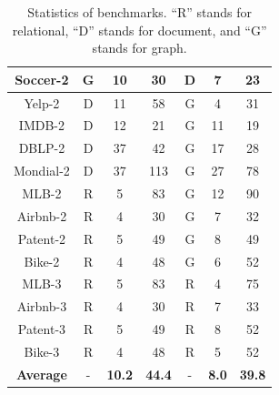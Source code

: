 \documentclass[]{article}
\begin{document}
\begin{table}
\begin{tabular}{|c|c|c|c|c|c|c|}
                    \hline
                    Soccer-2 & G & 10 & 30 & D & 7 & 23 \\
                    \hline
                    Yelp-2 & D & 11 & 58 & G & 4 & 31 \\
                    \hline
                    IMDB-2 & D & 12 & 21 & G & 11 & 19 \\
                    \hline
                    DBLP-2 & D & 37 & 42 & G & 17 & 28 \\
                    \hline
                    Mondial-2 & D & 37 & 113 & G & 27 & 78 \\
                    \hline
                    MLB-2 & R & 5 & 83 & G & 12 & 90 \\
                    \hline
                    Airbnb-2 & R & 4 & 30 & G & 7 & 32 \\
                    \hline
                    Patent-2 & R & 5 & 49 & G & 8 & 49 \\
                    \hline
                    Bike-2 & R & 4 & 48 & G & 6 & 52 \\
                    \hline
                    MLB-3 & R & 5 & 83 & R & 4 & 75 \\
                    \hline
                    Airbnb-3 & R & 4 & 30 & R & 7 & 33 \\
                    \hline
                    Patent-3 & R & 5 & 49 & R & 8 & 52 \\
                    \hline
                    Bike-3 & R & 4 & 48 & R & 5 & 52 \\
                    \hline
                    \hline
                    \textbf{Average} & - & \textbf{10.2} & \textbf{44.4} & - & \textbf{8.0} & \textbf{39.8} \\
                    \hline
                    \end{tabular}
                    \vspace{10pt}
                    \caption{Statistics of benchmarks. ``R'' stands for relational, ``D'' stands for document, and ``G'' stands for graph.}
                    \label{tab:benchmarks}
                    \vspace{-10pt}
                \end{table}
\end{document}
